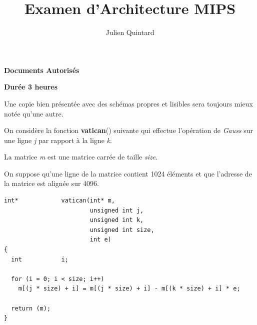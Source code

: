 
%
%



%
%


%
%

\title{Examen d'Architecture MIPS}

%
%

\author{\small{Julien Quintard}}

%
%



%
%

\maketitle

%
%

\begin{center}

\textbf{Documents Autoris\'es}

\textbf{Dur\'ee 3 heures}

\scriptsize{Une copie bien pr\'esent\'ee avec des sch\'emas propres et
	    lisibles sera toujours mieux not\'ee qu'une autre.}
\end{center}

%
%

On consid\`ere la fonction \textbf{vatican}() suivante qui effectue
l'op\'eration de \textit{Gauss} sur une ligne \textit{j} par rapport \`a
la ligne \textit{k}.

La matrice \textit{m} est une matrice carr\'ee de taille \textit{size}.

On suppose qu'une ligne de la matrice contient 1024 \'el\'ements
et que l'adresse de la matrice est align\'ee sur 4096.

\begin{verbatim}
int*            vatican(int* m,
                        unsigned int j,
                        unsigned int k,
                        unsigned int size,
                        int e)
{
  int           i;

  for (i = 0; i < size; i++)
    m[(j * size) + i] = m[(j * size) + i] - m[(k * size) + i] * e;

  return (m);
}
\end{verbatim}

